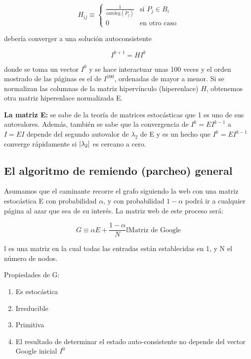 \documentclass[11pt, spanish]{report}
\begin{document}
\[
H_{ij} \equiv \begin{cases}
\frac{1}{\mathrm{outdeg}(P_j)} & \text{si } P_j \in B_i \\
0 & \text{en otro caso}
\end{cases}
\]

debería converger a una solución autoconsistente

\[
I^{k+1} = H I^k
\]

donde se toma un vector $I^{0}$ y se hace interactuar unas 100 veces y el orden
mostrado de las páginas es el de $I^{100}$, ordenadas de mayor a menor. Si se
normalizan las columnas de la matriz hipervínculo (hiperenlace) $H$, obtenemos
otra matriz hiperenlace normalizada E.

\textbf{La matriz E:} se sabe de la teoría de matrices estocásticas que 1 es uno
de sus autovalores. Además, también se sabe que la convergencia de $I^k = E
I^{k-1}$ a $I = E I$ depende del segundo autovalor de $\lambda_2$ de E y es un
hecho que $I^k = E I^{k-1}$ converge rápidamente si $\abs{\lambda_2}$ es
cercano a cero.

\subsection{El algoritmo de remiendo (parcheo) general}

Asumamos que el caminante recorre el grafo siguiendo la web con una matriz
estocástica E con probabilidad $\alpha$, y con probabilidad $1-\alpha$ podrá ir
a cualquier página al azar que sea de su interés. La matriz web de este proceso
será:

\[
G \equiv \alpha E + \frac{1-\alpha}{N} \mathds{I} \text{Matriz de Google}
\]

$\mathds{I}$ es una matriz en la cual todas las entradas están establecidas en
1, y N el número de nodos.

Propiedades de G:
\begin{enumerate}
\item Es estocástica
\item Irreducible
\item Primitiva
\item El resultado de determinar el estado auto-consistente no depende del
    vector Google inicial $I^0$
\end{enumerate}
\end{document}
